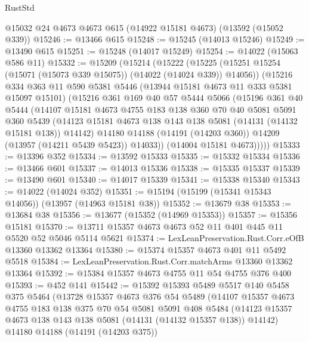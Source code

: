 \begin{lexlean}{RustStd}
\begin{coremodule}
    @15032
    @24
    @4673
    @4673
    @615
    (@14922 @15181 @4673)
    (@13592 (@15052 @339))
@15246 := @13466 @615
@15248 := @15245 (@14013 @15246)
@15249 := @13490 @615
@15251 := @15248 (@14017 @15249)
@15254 := @14022 (@15063 @586 @11)
@15332 := @15209
    (@15214
      (@15222
        (@15225 (@15251 @15254 (@15071 (@15073 @339 @15075)) (@14022 (@14024 @339)) @14056))
        (@15216
          @334
          @363
          @11
          @590
          @5381
          @5446
          (@13944 @15181 @4673 @11 @333 @5381 @15097 @15101)
          (@15216
            @361
            @169
            @40
            @57
            @5444
            @5066
            (@15196
              @361
              @40
              @5444
              (@14107
                @15181
                @4673
                @4755
                @183
                @138
                @360
                @70
                @40
                @5081
                @5091
                @360
                @5439
                (@14123 @15181 @4673 @138 @143 @138 @5081 (@14131 (@14132 @15181 @138)) @14142)
                @14180
                @14188
                (@14191 (@14203 @360))
                @14209
                (@13957 (@14211 @5439 @5423))
                @14033))
            (@14004 @15181 @4673)))))
@15333 := @13396 @352
@15334 := @13592 @15333
@15335 := @15332 @15334
@15336 := @13466 @601
@15337 := @14013 @15336
@15338 := @15335 @15337
@15339 := @13490 @601
@15340 := @14017 @15339
@15341 := @15338 @15340
@15343 := @14022 (@14024 @352)
@15351 := @15194 (@15199 (@15341 @15343 @14056)) (@13957 (@14963 @15181 @38))
@15352 := @13679 @38
@15353 := @13684 @38
@15356 := @13677 (@15352 (@14969 @15353))
@15357 := @15356 @15181
@15370 := @13711 @15357 @4673 @4673 @52 @11 @401 @445 @11 @5520 @52 @5046 @5114 @5621
@15374 := LexLeanPreservation.Rust.Corr.eOfB @13360 @13362 @13364
@15380 := @15374 @15357 @4673 @401 @11 @5492 @5518
@15384 := LexLeanPreservation.Rust.Corr.matchArms @13360 @13362 @13364
@15392 := @15384 @15357 @4673 @4755 @11 @54 @4755 @376 @400
@15393 := @452 @141
@15442 := @15392
    @15393
    @5489
    @5517
    @140
    @5458
    @375
    @5464
    (@13728
      @15357
      @4673
      @376
      @54
      @5489
      (@14107
        @15357
        @4673
        @4755
        @183
        @138
        @375
        @70
        @54
        @5081
        @5091
        @408
        @5484
        (@14123 @15357 @4673 @138 @143 @138 @5081 (@14131 (@14132 @15357 @138)) @14142)
        @14180
        @14188
        (@14191 (@14203 @375))

\end{coremodule}
\end{lexlean}
